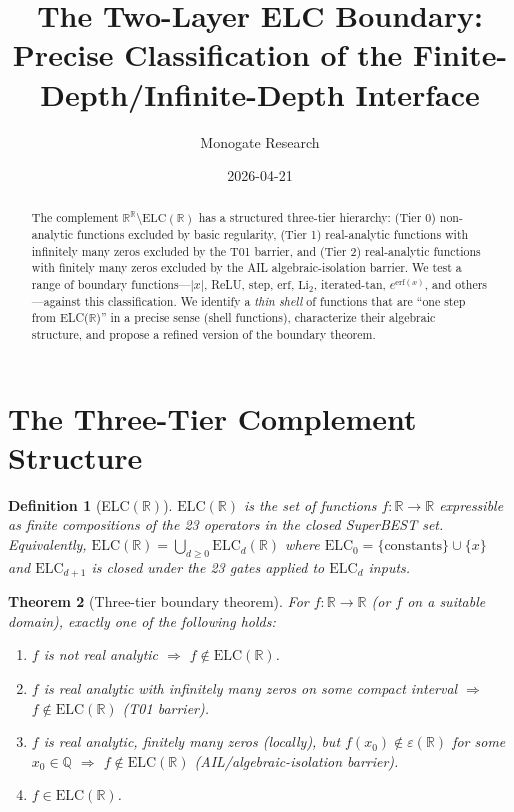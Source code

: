 \documentclass[11pt]{article}
\title{The Two-Layer ELC Boundary:\\
Precise Classification of the Finite-Depth/Infinite-Depth Interface}
\author{Monogate Research}
\date{2026-04-21}
\newtheorem{theorem}{Theorem}
\newtheorem{definition}[theorem]{Definition}
\begin{document}
\maketitle

\begin{abstract}
The complement $\mathbb{R}^{\mathbb{R}}\setminus\mathrm{ELC}(\mathbb{R})$ has a structured
three-tier hierarchy: (Tier 0) non-analytic functions excluded by basic regularity,
(Tier 1) real-analytic functions with infinitely many zeros excluded by the T01 barrier,
and (Tier 2) real-analytic functions with finitely many zeros excluded by the AIL
algebraic-isolation barrier.
We test a range of boundary functions---$|x|$, ReLU, step, $\mathrm{erf}$, $\mathrm{Li}_2$,
iterated-tan, $e^{\mathrm{erf}(x)}$, and others---against this classification.
We identify a \emph{thin shell} of functions that are ``one step from ELC($\mathbb{R}$)''
in a precise sense (shell functions), characterize their algebraic structure,
and propose a refined version of the boundary theorem.
\end{abstract}

\section{The Three-Tier Complement Structure}

\begin{definition}[ELC$(\mathbb{R})$]
$\mathrm{ELC}(\mathbb{R})$ is the set of functions $f:\mathbb{R}\to\mathbb{R}$ expressible
as finite compositions of the 23 operators in the closed SuperBEST set.
Equivalently, $\mathrm{ELC}(\mathbb{R})=\bigcup_{d\geq0}\mathrm{ELC}_d(\mathbb{R})$
where $\mathrm{ELC}_0=\{\text{constants}\}\cup\{x\}$ and
$\mathrm{ELC}_{d+1}$ is closed under the 23 gates applied to $\mathrm{ELC}_d$ inputs.
\end{definition}

\begin{theorem}[Three-tier boundary theorem]
\label{thm:threetier}
For $f:\mathbb{R}\to\mathbb{R}$ (or $f$ on a suitable domain), exactly one of the
following holds:
\begin{enumerate}
  \item[\emph{(Tier 0)}] $f$ is not real analytic $\Rightarrow$ $f\notin\mathrm{ELC}(\mathbb{R})$.
  \item[\emph{(Tier 1)}] $f$ is real analytic with infinitely many zeros on some compact interval
    $\Rightarrow$ $f\notin\mathrm{ELC}(\mathbb{R})$ (T01 barrier).
  \item[\emph{(Tier 2)}] $f$ is real analytic, finitely many zeros (locally), but
    $f(x_0)\notin\varepsilon(\mathbb{R})$ for some $x_0\in\mathbb{Q}$
    $\Rightarrow$ $f\notin\mathrm{ELC}(\mathbb{R})$ (AIL/algebraic-isolation barrier).
  \item[\emph{(In ELC)}] $f\in\mathrm{ELC}(\mathbb{R})$.
\end{enumerate}
\end{theorem}
\end{document}
